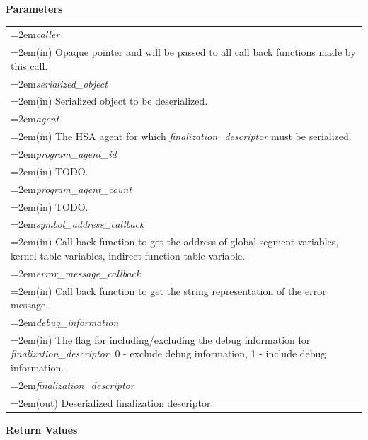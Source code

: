 \documentclass[final]{book}
\newcommand{\hsaarg}[1]{\textit{#1}}
\begin{document}
\noindent\textbf{Parameters}\\[-6mm]
\noindent\begin{longtable}{@{}>{\hangindent=2em}p{\textwidth}}
\hsaarg{caller}\\\hspace{2em}(in) Opaque pointer and will be passed to all call back functions made by this call.\\[2mm]
\hsaarg{serialized_\-object}\\\hspace{2em}(in) Serialized object to be deserialized.\\[2mm]
\hsaarg{agent}\\\hspace{2em}(in) The HSA agent for which \textit{finalization_\-descriptor} must be serialized.\\[2mm]
\hsaarg{program_\-agent_\-id}\\\hspace{2em}(in) TODO.\\[2mm]
\hsaarg{program_\-agent_\-count}\\\hspace{2em}(in) TODO.\\[2mm]
\hsaarg{symbol_\-address_\-callback}\\\hspace{2em}(in) Call back function to get the address of global segment variables, kernel table variables, indirect function table variable.\\[2mm]
\hsaarg{error_\-message_\-callback}\\\hspace{2em}(in) Call back function to get the string representation of the error message.\\[2mm]
\hsaarg{debug_\-information}\\\hspace{2em}(in) The flag for including/excluding the debug information for \textit{finalization_\-descriptor}. 0 - exclude debug information, 1 - include debug information.\\[2mm]
\hsaarg{finalization_\-descriptor}\\\hspace{2em}(out) Deserialized finalization descriptor.
\end{longtable}
\vspace{-5mm}\noindent\textbf{Return Values}\\[-6mm]
\end{document}
